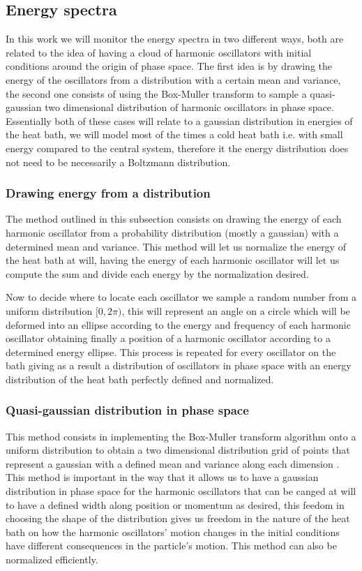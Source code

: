 \subsection{Energy spectra}
In this work we will monitor the energy spectra in two different ways, both are related to the idea of having a cloud of harmonic oscillators with initial conditions around the origin of phase space. The first idea is by  drawing the energy of the oscillators from a distribution with a certain mean and variance, the second one consists of using the Box-Muller transform to sample a quasi-gaussian two dimensional distribution of harmonic oscillators in phase space.  Essentially both of these cases will relate to a gaussian distribution in energies of the heat bath, we will model most of the times a cold heat bath i.e. with small energy compared to the central system, therefore it the energy distribution does not need to be necessarily a Boltzmann distribution.
\subsubsection{Drawing energy from a distribution}
The method outlined in this subsection consists on drawing the energy of each harmonic oscillator from a probability distribution (mostly a gaussian) with a determined mean and variance. This method will let us normalize the energy of the heat bath at will, having the energy of each harmonic oscillator will let us compute the sum and divide each energy by the normalization desired.\par 
Now to decide where to locate each oscillator we sample a random number from a uniform distribution $[0,2\pi)$, this will represent an angle on a circle which will be deformed into an ellipse according to the energy and frequency of each harmonic oscillator obtaining finally a position of a harmonic oscillator according to a determined energy ellipse. This process is repeated for every oscillator on the bath giving as a result a distribution of oscillators in phase space with an energy distribution of the heat bath perfectly defined and normalized.

\subsubsection{Quasi-gaussian distribution in phase space}
This method consists in implementing the Box-Muller transform algorithm onto a uniform distribution to obtain a two dimensional distribution grid of points that represent a gaussian with a defined mean and variance along each dimension \cite{box1958note}. This method is important in the way that it allows us to have a gaussian distribution in phase space for the harmonic oscillators that can be canged at will to have a defined width along position or momentum as desired, this feedom in choosing the shape of the distribution gives us freedom in the nature of the heat bath on how the harmonic oscillators' motion changes in the initial conditions have different consequences in the particle's motion. This method can also be normalized efficiently.





